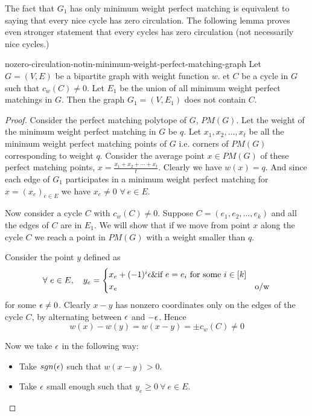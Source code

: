 The fact that $G_1$ has only minimum weight perfect matching is equivalent to saying that every nice cycle has zero circulation. The following lemma proves even stronger statement that every cycles has zero circulation (not necessarily nice cycles.)
\begin{Lemma}{\cite[Lemma 3.2]{FennerGurjarThierauf_2016_Bpm_CONF}}{nozero-circulation-notin-minimum-weight-perfect-matching-graph}
	Let $G=(V,E)$ be a bipartite graph with weight function $w$. et $C$ be a cycle in $G$ such that $c_w(C)\neq 0$. Let $E_1$ be the union of all minimum weight perfect matchings in $G$. Then the graph $G_1=(V,E_1)$ does not contain $C$.
\end{Lemma}
\begin{proof}
	Consider the perfect matching polytope of $G$, $PM(G)$. Let the weight of the minimum weight perfect matching in $G$ be $q$. Let $x_1,x_2,\dots,x_t$ be all the minimum weight perfect matching points of $G$ i.e. corners of $PM(G)$ corresponding to weight $q$. Consider the average point $x\in PM(G)$ of these perfect matching points, $x=\frac{x_1+x_2+\cdots+x_t}{t}$. Clearly we have $w(x)=q$. And since each edge of $G_1$ participates in a minimum weight perfect matching for $x=(x_e)_{e\in E}$ we have $x_e\neq 0$ $\forall\ e\in E$. 
	
	Now consider a cycle $C$ with $c_w(C)\neq 0$. Suppose $C=(e_1,e_2,\dots, e_{k})$ and all the edges of $C$ are in $E_1$. We will show that if we move from point $x$ along the cycle $C$ we reach a point in $PM(G)$ with a weight smaller than $q$.
	
	Consider the point $y$ defined as $$\forall\ e\in E,\quad y_e=\begin{cases}
		x_e+(-1)^i\epsilon\& \text{if $e=e_i$ for some $i\in[k]$}\\
		x_e& \text{o/w}
	\end{cases}$$for some $\epsilon\neq 0$. Clearly $x-y$ has nonzero coordinates only on the edges of the cycle $C$, by alternating between $\epsilon$ and $-\epsilon$. Hence $$w(x)-w(y)=w(x-y)=\pm c_w(C)\neq 0$$

Now we take $\epsilon$ in the following way:
\begin{itemize}
	\item Take $sgn(\epsilon)$ such that $w(x-y)>0$.
	\item Take $\epsilon$ small enough such that $y_e\geq 0\ \forall\ e\in E$.
\end{itemize}


\end{proof}
